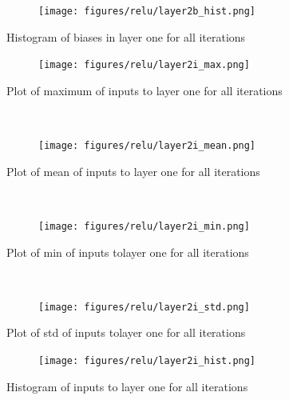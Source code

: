 \documentclass[]{article}
\begin{document}
\begin{figure}
    \centering
    \begin{subfigure}
        \centering
        \texttt{[image: figures/relu/layer2b\_hist.png]}
    \end{subfigure}%
    \caption{Histogram of biases in layer one for all iterations}
 \label{fig:/layer2b_hist}
\end{figure}



\begin{figure}[ht]
    \centering
    \begin{subfigure}
        \centering
        \texttt{[image: figures/relu/layer2i\_max.png]}
    \end{subfigure}%
    \caption{Plot of maximum of inputs to layer one for all iterations}
 \label{fig:/layer2i_max}
    ~ 
    \centering
    \begin{subfigure}
        \centering
        \texttt{[image: figures/relu/layer2i\_mean.png]}
    \end{subfigure}%
    \caption{Plot of mean of inputs to layer one for all iterations}
 \label{fig:/layer2i_mean}
    ~ 
    \centering
    \begin{subfigure}
        \centering
        \texttt{[image: figures/relu/layer2i\_min.png]}
    \end{subfigure}%
    \caption{Plot of min of inputs tolayer one for all iterations}
 \label{fig:/layer2i_min}
    ~ 
    \centering
    \begin{subfigure}
        \centering
        \texttt{[image: figures/relu/layer2i\_std.png]}
    \end{subfigure}%
    \caption{Plot of std of inputs tolayer one for all iterations}
 \label{fig:/layer2i_std}
\end{figure}

\begin{figure}
    \centering
    \begin{subfigure}
        \centering
        \texttt{[image: figures/relu/layer2i\_hist.png]}
    \end{subfigure}%
    \caption{Histogram of inputs to layer one for all iterations}
 \label{fig:/layer2i_hist}
\end{figure}
\end{document}
